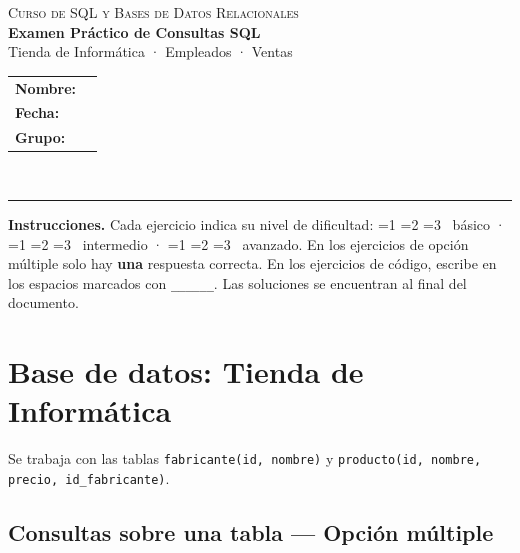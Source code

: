 \documentclass[12pt, a4paper]{article}
\newcommand{\blank}[1][4cm]{\underline{\hspace{#1}}}
\newcommand{\estrella}{{\color{Goldenrod}\faStarSolid}}
\newcommand{\estrellavacia}{{\color{gray!45}\faStarSolid}}
\newcommand{\nivel}[1]{%
  \ifnum#1=1\estrella\estrellavacia\estrellavacia\fi
  \ifnum#1=2\estrella\estrella\estrellavacia\fi
  \ifnum#1=3\estrella\estrella\estrella\fi
}
\begin{document}

\begin{center}
  {\large\textsc{Curso de SQL y Bases de Datos Relacionales}}\\[6pt]
  {\LARGE\textbf{Examen Práctico de Consultas SQL}}\\[4pt]
  {\large Tienda de Informática · Empleados · Ventas}\\[8pt]
  \small
  \begin{tabular}{ll}
    \textbf{Nombre:} & \blank[7cm] \\[6pt]
    \textbf{Fecha:}  & \blank[3cm] \\[6pt]
    \textbf{Grupo:}  & \blank[3cm] \\
  \end{tabular}\\[10pt]
  \hrule
\end{center}

\begin{nota}
\textbf{Instrucciones.}
Cada ejercicio indica su nivel de dificultad:
\nivel{1}~básico · \nivel{2}~intermedio · \nivel{3}~avanzado.
En los ejercicios de opción múltiple solo hay \textbf{una} respuesta correcta.
En los ejercicios de código, escribe en los espacios marcados con \texttt{\_\_\_\_\_\_}.
Las soluciones se encuentran al final del documento.
\end{nota}

\tableofcontents
\newpage

\section{Base de datos: Tienda de Informática}

\begin{nota}
Se trabaja con las tablas \texttt{fabricante(id, nombre)} y
\texttt{producto(id, nombre, precio, id\_fabricante)}.
\end{nota}

\subsection{Consultas sobre una tabla — Opción múltiple}
\end{document}
